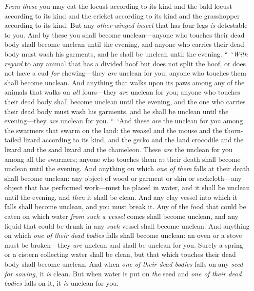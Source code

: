 \begin{biblechapter}
\verse \textit{From these} you may eat the locust according to its kind and the bald locust according to its kind and the cricket according to its kind and the grasshopper according to its kind.
\verse But any \textit{other} \textit{winged insect} that has four legs \textit{is} detestable to you.
\verse And by these you shall become unclean—anyone who touches their dead body shall become unclean until the evening,
\verse and anyone who carries their dead body must wash his garments, and he shall be unclean until the evening.
\verse “ ‘\textit{With regard} to any animal that has a divided hoof but does not split the hoof, or does not have a cud \textit{for} chewing—they \textit{are} unclean for you; anyone who touches them shall become unclean.
\verse And anything that walks upon its paws among any of the animals that walks on \textit{all} fours—they \textit{are} unclean for you; anyone who touches their dead body shall become unclean until the evening,
\verse and the one who carries their dead body must wash his garments, and he shall be unclean until the evening—they \textit{are} unclean for you.
\verse “ ‘And these \textit{are} the unclean for you among the swarmers that swarm on the land: the weasel and the mouse and the thorn-tailed lizard according to its kind,
\verse and the gecko and the land crocodile and the lizard and the sand lizard and the chameleon.
\verse These \textit{are} the unclean for you among all the swarmers; anyone who touches them at their death shall become unclean until the evening.
\verse And anything on which \textit{one of them} falls at their death shall become unclean: any object of wood or garment or skin or sackcloth—any object that has performed work—must be placed in water, and it shall be unclean until the evening, and \textit{then} it shall be clean.
\verse And any clay vessel into which it falls shall become unclean, and you must break it.
\verse Any of the food that could be eaten on which water \textit{from such a vessel} comes shall become unclean, and any liquid that could be drunk in any \textit{such} vessel shall become unclean.
\verse And anything on which \textit{one of their dead bodies} falls shall become unclean: an oven or a stove must be broken—they \textit{are} unclean and shall be unclean for you.
\verse Surely a spring or a cistern collecting water shall be clean, but that which touches their dead body shall become unclean.
\verse And when \textit{one of their dead bodies} falls on any \textit{seed for sowing}, it \textit{is} clean.
\verse But when water is put on \textit{the} seed and \textit{one of their dead bodies} falls on it, it \textit{is} unclean for you.

\end{biblechapter}
